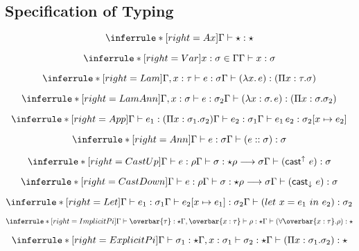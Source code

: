 \subsection{Specification of Typing}

\newcommand{\judge}{\Gamma\vdash}
\newcommand{\forallvars}[1]{\forall \overbar{#1}}

\framebox{$ \judge e : \sigma$ }

\[
\inferrule*[right=Ax]
{} {\judge \star : \star}
\]

\[
\inferrule*[right=Var]
{x : \sigma \in \Gamma} {\judge x : \sigma}
\]

\[
\inferrule*[right=Lam]
{\Gamma,x: \tau \vdash e : \sigma } {\judge (\lambda x.\, e) : (\Pi x: \tau. \sigma)}
\]

\[
\inferrule*[right=LamAnn]
{\Gamma,x: \sigma \vdash e : \sigma_2 } {\judge (\lambda x:\sigma.\, e) : (\Pi x: \sigma. \sigma_2)}
\]

\[
\inferrule*[right=App]
{\judge e_1 : (\Pi x:\sigma_1. \sigma_2) \\ \judge e_2 : \sigma_1} {\judge e_1\,e_2 : \sigma_2[\tpmapsto {\sigma_1} x {e_2}]}
\]

\[
\inferrule*[right=Ann]
{\judge e : \sigma }
{\judge (e :: \sigma) : \sigma }
\]

\[
\inferrule*[right=CastUp]
{\judge e : \rho \\ \judge \sigma : \star \\ \rho \longrightarrow \sigma} {\judge (\mathsf{cast}^\uparrow\ e) : \sigma}
\]

\[
\inferrule*[right=CastDown]
{\judge e : \rho \\ \judge \sigma : \star \\ \rho \longrightarrow \sigma} {\judge (\mathsf{cast}_\downarrow\ e) : \sigma}
\]

\[
\inferrule*[right=Let]
{\judge e_1 : \sigma_1 \\ \Gamma \vdash e_2[\tpmapsto {\sigma_1} x {e_1}]: \sigma_2} {\judge ( let\ x = e_1\ in\ e_2 ) : \sigma_2 }
\]

\[
\inferrule*[right=ImplicitPi]
{\judge \overbar{\tau} : \star \\ \Gamma, \overbar{x:\tau} \vdash \rho : \star} {\judge (\forallvars{x : \tau}. \rho) : \star}
\]

\[
\inferrule*[right=ExplicitPi]
{\judge \sigma_1 : \star \\ \Gamma, x:\sigma_1 \vdash \sigma_2 : \star} {\judge (\Pi x:\sigma_1. \sigma_2) : \star}
\]

